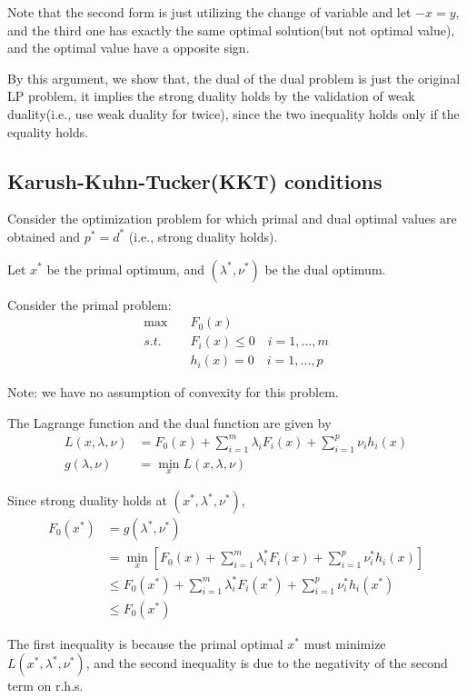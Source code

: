 Note that the second form is just utilizing the change of variable and let $-x=y$, and the third one has exactly the same optimal solution(but not optimal value), and the optimal value have a opposite sign.

By this argument, we show that, the dual of the dual problem is just the original LP problem, it implies the strong duality holds by the validation of weak duality(i.e., use weak duality for twice), since the two inequality holds only if the equality holds.


\subsection{Karush-Kuhn-Tucker(KKT) conditions}
Consider the optimization problem for which primal and dual optimal values are obtained and $p^*=d^*$ (i.e., strong duality holds).

Let $x^*$ be the primal optimum, and $(\lambda^*,\nu^*)$ be the dual optimum.

Consider the primal problem:
\begin{align*}
\max\quad &F_0(x)\\
s.t.\quad &F_i(x)\leq 0\quad i = 1,...,m\\
&h_i(x)= 0\quad i = 1,...,p
\end{align*}

Note: we have no assumption of convexity for this problem.

The Lagrange function and the dual function are given by 
\begin{align*}
L(x,\lambda,\nu) &= F_0(x)+\sum^m_{i=1}\lambda_iF_i(x) + \sum^p_{i=1}\nu_ih_i(x)\\
g(\lambda,\nu)&= \min_xL(x,\lambda,\nu)
\end{align*}

Since strong duality holds at $(x^*,\lambda^*,\nu^*)$,
\begin{align*}
F_0(x^*) 
&= g(\lambda^*,\nu^*) \\
&= \min_{x}[F_0(x)+\sum^m_{i=1}\lambda_i^*F_i(x) + \sum^p_{i=1}\nu_i^*h_i(x)]\\
&\leq F_0(x^*) +\sum^m_{i=1}\lambda_i^* F_i(x^*) + \sum^p_{i=1}\nu_i^* h_i(x^*)\\
&\leq F_0(x^*)
\end{align*}


The first inequality is because the primal optimal $x^*$ must minimize $L(x^*,\lambda^*,\nu^*)$, and the second inequality is due to the negativity of the second term on r.h.s. 

